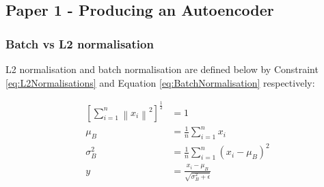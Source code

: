 \documentclass[12pt,onecolumn,letterpaper]{article}
\begin{document}
\subsection{Paper 1 - Producing an Autoencoder}

\subsubsection{Batch vs L2 normalisation}
\label{sec:BatchVsL2Normalisation}

L2 normalisation and batch normalisation are defined below by Constraint \ref{eq:L2Normalisations} and Equation \ref{eq:BatchNormalisation} respectively:

\begin{subequations}
\begin{align}
   \left[\sum_{i=1}^{n}\left \| x_i \right \|^2\right]^{\frac{1}{2}} &= 1 \label{eq:L2Normalisations}\\
   \mu_B &= \frac{1}{n} \sum_{i=1}^{n}x_i \\
   \sigma_B^2 &= \frac{1}{n} \sum_{i=1}^{n} \left(x_i - \mu_B \right)^2 \\
   y &= \frac{x_i - \mu_B}{\sqrt{\sigma_B^2 + \epsilon}}
   \label{eq:BatchNormalisation}
\end{align}
\end{subequations}
\end{document}
